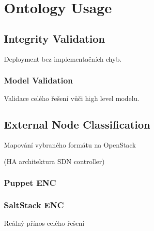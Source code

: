 
\section{Ontology Usage}

\subsection{Integrity Validation}

Deployment bez implementačních chyb.

\subsubsection{Model Validation}

Validace celého řešení vůči high level modelu.

\subsection{External Node Classification}

Mapování vybraného formátu na OpenStack

(HA architektura SDN controller)

\subsubsection{Puppet ENC}

\subsubsection{SaltStack ENC}

Reálný přínos celého řešení
